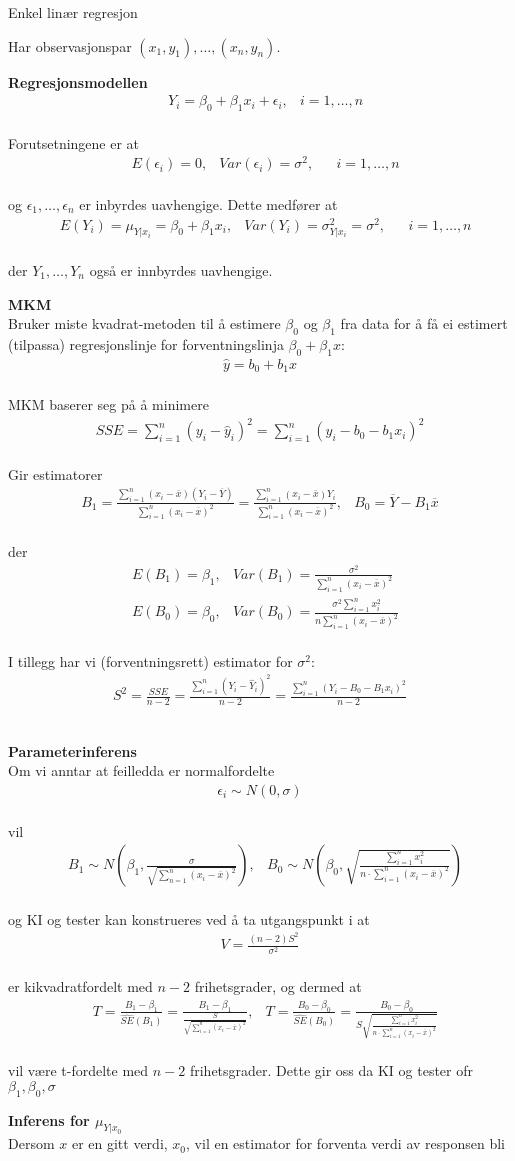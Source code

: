 \documentclass[final,hyperref={pdfpagelabels=false}]{beamer}
\newcommand{\maths}[1]{\vspace{-3mm}\begin{align*}#1\end{align*}\\\vspace{-3mm}}
\newcommand{\ol}[0]{\overline}
\newcommand{\tema}[2]{\footnotesize\raggedright\textbf{#1}\\{#2}\par}
\newcommand{\body}[1]{\footnotesize\raggedright{#1}\par}
\newcommand{\subsect}[1]{\center\normalsize{#1}\\}
\begin{document}
\begin{frame}{}
\begin{columns}[t]
\begin{column}{.33\linewidth}
\begin{block}{}
{				}\vspace{-3mm}
				\subsect{Enkel linær regresjon}
				\body{Har observasjonspar $(x_1,y_1),\ldots,(x_n,y_n)$.\\}
				\tema{Regresjonsmodellen}
				{\vspace{-3mm}\maths{&Y_i=\beta_0+\beta_1x_i+\epsilon_i, &i=1,\ldots,n}
					Forutsetningene er at
					\maths{&E(\epsilon_i)=0,&Var(\epsilon_i)=\sigma^2,& &i=1,\ldots,n}
					og $\epsilon_1,\ldots,\epsilon_n$ er inbyrdes uavhengige. Dette medfører at
					\maths{&E(Y_i)=\mu_{Y|x_i}=\beta_0+\beta_1x_i,&Var(Y_i)=\sigma_{Y|x_i}^2=\sigma^2,& &i=1,\ldots,n}
					der $Y_1,\ldots,Y_n$ også er innbyrdes uavhengige.}
				\tema{MKM}
				{Bruker miste kvadrat-metoden til å estimere $\beta_0$ og $\beta_1$ fra data for å få ei estimert (tilpassa) regresjonslinje for forventningslinja $\beta_0+\beta_1x$:
					\maths{\hat y=b_0+b_1x}
					MKM baserer seg på å minimere
					\maths{SSE=\sum_{i=1}^n(y_i-\hat y_i)^2=\sum_{i=1}^n(y_i-b_0-b_1x_i)^2}
					Gir estimatorer
					\maths{B_1=\frac{\sum_{i=1}^n(x_i-\bar x)(Y_i-\overline{Y})}{\sum_{i=1}^n(x_i-\overline{x})^2}=\frac{\sum_{i=1}^n(x_i-\bar x)Y_i}{\sum_{i=1}^n(x_i-\overline{x})^2}, &B_0=\overline{Y}-B_1\overline{x}}
					der
					\maths{&E(B_1)=\beta_1, &Var(B_1)=\frac{\sigma^2}{\sum_{i=1}^n(x_i-\overline x)^2}\\
						&E(B_0)=\beta_0, &Var(B_0)=\frac{\sigma^2\sum_{i=1}^nx_i^2}{n\sum_{i=1}^n(x_i-\overline{x})^2}}
					I tillegg har vi (forventningsrett) estimator for $\sigma^2$:
					\maths{S^2=\frac{SSE}{n-2}=\frac{\sum_{i=1}^n(Y_i-\hat Y_i)^2}{n-2}=\frac{\sum_{i=1}^n(Y_i-B_0-B_1x_i)^2}{n-2}}}
				\tema{Parameterinferens}
				{Om vi anntar at feilledda er normalfordelte
					\maths{\epsilon_i\sim N(0,\sigma)}
					vil
					\maths{&B_1\sim N\left(\beta_1,\frac{\sigma}{\sqrt{\sum_{n=1}^n(x_i-\ol x)^2}}\right), &B_0\sim N\left(\beta_0,\sqrt{\frac{\sum_{i=1}^nx_i^2}{n\cdot\sum_{i=1}^n(x_i-\ol x)^2}}\right)}
					og KI og tester kan konstrueres ved å ta utgangspunkt i at
					\maths{V=\frac{(n-2)S^2}{\sigma^2}}
					er kikvadratfordelt med $n-2$ frihetsgrader, og dermed at
					\maths{&T=\frac{B_1-\beta_1}{\hat{SE}(B_1)}=\frac{B_1-\beta_1}{\frac{S}{\sqrt{\sum_{i=1}^n(x_i-\ol x)^2}}}, &T=\frac{B_0-\beta_0}{\hat{SE}(B_0)}=\frac{B_0-\beta_0}{S\sqrt{\frac{\sum_{i=1}^nx_i^2}{n\cdot\sum_{i=1}^n(x_i-\ol x)^2}}}}
					vil være t-fordelte med $n-2$ frihetsgrader. Dette gir oss da KI og tester ofr $\beta_1,\beta_0,\sigma$}
				\tema{Inferens for $\mu_{Y|x_0}$}
				{Dersom $x$ er en gitt verdi, $x_0$, vil en estimator for forventa verdi av responsen bli
}
\end{block}
\end{column}
\end{columns}
\end{frame}
\end{document}

